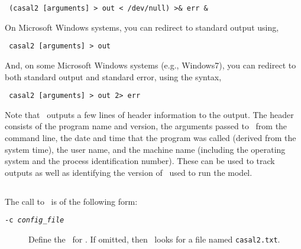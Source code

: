 \begin{verbatim} (casal2 [arguments] > out < /dev/null) >& err &\end{verbatim}

On Microsoft Windows systems, you can redirect to standard output using,

\begin{verbatim} casal2 [arguments] > out\end{verbatim}

And, on some Microsoft Windows systems (e.g., Windows7), you can redirect to both standard output and standard error, using the syntax, 

\begin{verbatim} casal2 [arguments] > out 2> err\end{verbatim}

Note that \CNAME\ outputs a few lines of header information to the output. The header consists of the program name and version, the arguments passed to \CNAME\ from the command line, the date and time that the program was called (derived from the system time), the user name, and the machine name (including the operating system and the process identification number). These can be used to track outputs as well as identifying the version of \CNAME\ used to run the model.

\subsection{\label{sec:command-line-arguments}}

The call to \CNAME\ is of the following form: 

\texttt{}

\begin{description}
  \item [\texttt{-c \emph{config\_file}}] Define the \config\ for \CNAME. If omitted, then \CNAME\ looks for a file named \texttt{casal2.txt}.
\end{description}

